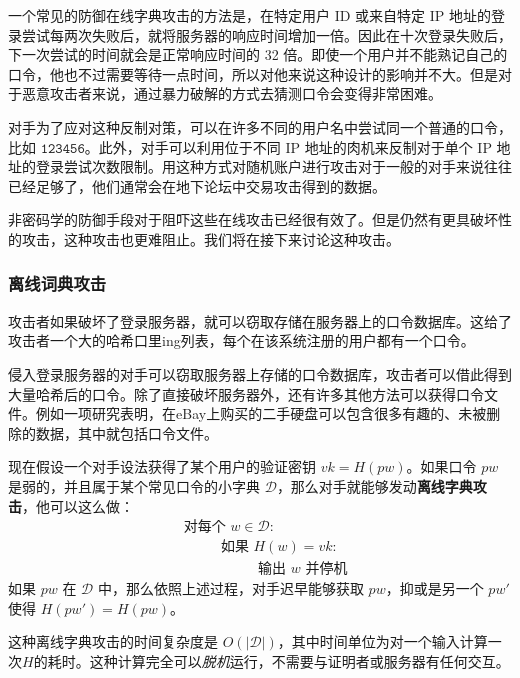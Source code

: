 一个常见的防御在线字典攻击的方法是，在特定用户 ID 或来自特定 IP 地址的登录尝试每两次失败后，就将服务器的响应时间增加一倍。因此在十次登录失败后，下一次尝试的时间就会是正常响应时间的 32 倍。即使一个用户并不能熟记自己的口令，他也不过需要等待一点时间，所以对他来说这种设计的影响并不大。但是对于恶意攻击者来说，通过暴力破解的方式去猜测口令会变得非常困难。

对手为了应对这种反制对策，可以在许多不同的用户名中尝试同一个普通的口令，比如 $\mathtt{123456}$。此外，对手可以利用位于不同 IP 地址的肉机来反制对于单个 IP 地址的登录尝试次数限制。用这种方式对随机账户进行攻击对于一般的对手来说往往已经足够了，他们通常会在地下论坛中交易攻击得到的数据。

非密码学的防御手段对于阻吓这些在线攻击已经很有效了。但是仍然有更具破坏性的攻击，这种攻击也更难阻止。我们将在接下来讨论这种攻击。

\subsubsection{离线词典攻击}\label{subsubsec:18-3-1-2}

攻击者如果破坏了登录服务器，就可以窃取存储在服务器上的口令数据库。这给了攻击者一个大的哈希口里ing列表，每个在该系统注册的用户都有一个口令。

侵入登录服务器的对手可以窃取服务器上存储的口令数据库，攻击者可以借此得到大量哈希后的口令。除了直接破坏服务器外，还有许多其他方法可以获得口令文件。例如一项研究表明，在eBay上购买的二手硬盘可以包含很多有趣的、未被删除的数据，其中就包括口令文件。

现在假设一个对手设法获得了某个用户的验证密钥 $vk=H(pw)$。如果口令 $pw$ 是弱的，并且属于某个常见口令的小字典 $\mathcal{D}$，那么对手就能够发动\textbf{离线字典攻击}，他可以这么做：
\begin{equation}\label{eq:18-1}
	\begin{aligned}
		& \text{对每个~}w\in\mathcal{D}:\\
		& \text{~~~~~~~~如果~}H(w)=vk:\\
		& \text{~~~~~~~~~~~~~~~~输出~} w \text{ 并停机}
	\end{aligned}
\end{equation}
如果 $pw$ 在 $\mathcal{D}$ 中，那么依照上述过程，对手迟早能够获取 $pw$，抑或是另一个 $pw'$ 使得 $H(pw')=H(pw)$。

这种离线字典攻击的时间复杂度是 $O(|\mathcal{D}|)$，其中时间单位为对一个输入计算一次$H$的耗时。这种计算完全可以\emph{脱机}运行，不需要与证明者或服务器有任何交互。

